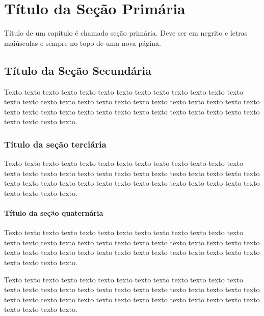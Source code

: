 \chapter{Título da Seção Primária}

Título de um capítulo é chamado seção primária. Deve ser em negrito e letras maiúsculas e sempre no topo de uma nova página.

\section{Título da Seção Secundária}

Texto texto texto texto texto texto texto texto texto texto texto texto texto texto
texto texto texto texto texto texto texto texto texto texto texto texto texto texto texto
texto texto texto texto texto texto texto texto texto texto texto texto texto texto texto
texto.

\subsection{Título da seção terciária}

Texto texto texto texto texto texto texto texto texto texto texto texto texto texto
texto texto texto texto texto texto texto texto texto texto texto texto texto texto texto
texto texto texto texto texto texto texto texto texto texto texto texto texto texto texto
texto.

\subsubsection{Título da seção quaternária}

Texto texto texto texto texto texto texto texto texto texto texto texto texto texto
texto texto texto texto texto texto texto texto texto texto texto texto texto texto texto
texto texto texto texto texto texto texto texto texto texto texto texto texto texto texto
texto.


Texto texto texto texto texto texto texto texto texto texto texto texto texto texto
texto texto texto texto texto texto texto texto texto texto texto texto texto texto texto
texto texto texto texto texto texto texto texto texto texto texto texto texto texto texto
texto.
